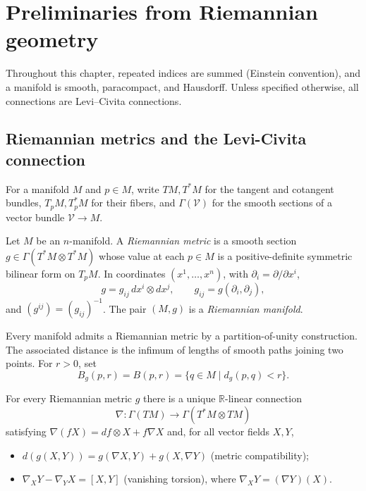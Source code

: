 \chapter{Preliminaries from Riemannian geometry}
\label{chap:prelim}
\label{sectprelim}

Throughout this chapter, repeated indices are summed (Einstein
convention), and a manifold is smooth, paracompact, and Hausdorff. Unless
specified otherwise, all connections are Levi--Civita connections.


\section{Riemannian metrics and the Levi-Civita connection}

For a manifold $M$ and $p\in M$, write $TM,T^*M$ for the tangent and
cotangent bundles, $T_pM,T_p^*M$ for their fibers, and
$\Gamma(\mathcal V)$ for the smooth sections of a vector bundle
$\mathcal V\to M$.

\begin{definition}
\label{def:riemannian-metric}




Let $M$ be an $n$-manifold. A \emph{Riemannian metric} is a smooth
section $g\in\Gamma(T^*M\otimes T^*M)$ whose value at each $p\in M$ is
a positive-definite symmetric bilinear form on $T_pM$. In coordinates
$(x^1,\ldots,x^n)$, with $\partial_i=\partial/\partial x^i$,
\[
  g=g_{ij}\,dx^i\otimes dx^j,
  \qquad g_{ij}=g(\partial_i,\partial_j),
\]
and $(g^{ij})=(g_{ij})^{-1}$. The pair $(M,g)$ is a \emph{Riemannian
manifold}.
\end{definition}

Every manifold admits a Riemannian metric by a partition-of-unity
construction. The associated distance is the infimum of lengths of smooth
paths joining two points. For $r>0$, set
\[
  B_g(p,r)=B(p,r)=\{q\in M\mid d_g(p,q)<r\}.
\]

\begin{theorem}
\label{thm:levi-civita-connection}





For every Riemannian metric $g$ there is a unique $\mathbb R$-linear
connection
\[
  \nabla:\Gamma(TM)\longrightarrow\Gamma(T^*M\otimes TM)
\]
satisfying $\nabla(fX)=df\otimes X+f\nabla X$ and, for all vector
fields $X,Y$,
\begin{itemize}
\item[$\bullet$] $d(g(X,Y))=g(\nabla X,Y)+g(X,\nabla Y)$
  (metric compatibility);
\item[$\bullet$] $\nabla_XY-\nabla_YX=[X,Y]$ (vanishing torsion),
  where $\nabla_XY=(\nabla Y)(X)$.
\end{itemize}
\end{theorem}

